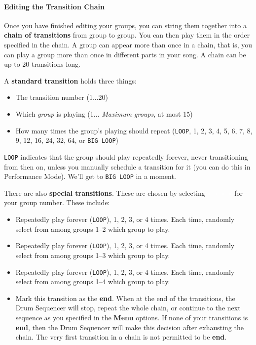 \documentclass{article}
\begin{document}
\paragraph{Editing the Transition Chain}

Once you have finished editing your groups, you can string them together into a {\bf chain of transitions} from group to group.  You can then play them in the order specified in the chain.   A group can appear more than once in a chain, that is, you can play a group more than once in different parts in your song.  A chain can be up to 20 transitions long.

A {\bf standard transition} holds three things:

\begin{itemize}
\item The transition number (1...20)
\item Which {\it group} is playing (1... {\it Maximum groups}, at most 15)
\item How many times the group's playing should repeat (\texttt{LOOP}, 1, 2, 3, 4, 5, 6, 7, 8, 9, 12, 16, 24, 32, 64, or \texttt{BIG~LOOP})
\end{itemize}

{\tt LOOP} indicates that the group should play repeatedly forever, never transitioning from then on, unless you manually schedule a transition for it (you can do this in Performance Mode).  We'll get to {\tt BIG LOOP} in a moment.

There are also {\bf special transitions}.  These are chosen by selecting {\tt - - - -} for your group number.  These include:

\begin{itemize}
\item Repeatedly play forever (\texttt{LOOP}), 1, 2, 3, or 4 times.  Each time, randomly select from among groups 1--2 which group to play.
\item Repeatedly play forever (\texttt{LOOP}), 1, 2, 3, or 4 times.  Each time, randomly select from among groups 1--3 which group to play.  
\item Repeatedly play forever (\texttt{LOOP}), 1, 2, 3, or 4 times.  Each time, randomly select from among groups 1--4 which group to play.
\item Mark this transition as the {\bf end}.  When at the end of the transitions, the Drum Sequencer will stop, repeat the whole chain, or continue to the next sequence as you specified in the {\bf Menu} options.  If none of your transitions is {\bf end}, then the Drum Sequencer will make this decision after exhausting the chain.   The very first transition in a chain is not permitted to be {\bf end}.
\end{itemize}
\end{document}
